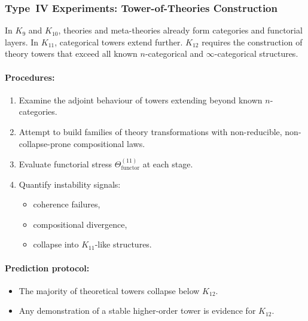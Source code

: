 \subsubsection{Type~IV Experiments: Tower-of-Theories Construction}

In $K_{9}$ and $K_{10}$, theories and meta-theories already form 
categories and functorial layers.  
In $K_{11}$, categorical towers extend further.  
$K_{12}$ requires the construction of theory towers that exceed all 
known $n$-categorical and $\infty$-categorical structures.

\paragraph{Procedures:}

\begin{enumerate}
    \item Examine the adjoint behaviour of towers extending beyond 
          known $n$-categories.
    \item Attempt to build families of theory transformations with  
          non-reducible, non-collapse-prone compositional laws.
    \item Evaluate functorial stress 
          $\Theta_{\mathrm{functor}}^{(11)}$ at each stage.
    \item Quantify instability signals:
          \begin{itemize}
              \item coherence failures,
              \item compositional divergence,
              \item collapse into $K_{11}$-like structures.
          \end{itemize}
\end{enumerate}

\paragraph{Prediction protocol:}

\begin{itemize}
    \item The majority of theoretical towers collapse below $K_{12}$.
    \item Any demonstration of a stable higher-order tower is evidence 
          for $K_{12}$.
\end{itemize}



